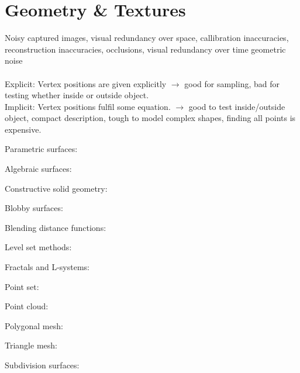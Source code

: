 \section{Geometry \& Textures}
 Noisy captured images, visual redundancy over space, callibration inaccuracies, reconstruction inaccuracies, occlusions, visual redundancy over time geometric noise \\
 \\
Explicit: Vertex positions are given explicitly $\rightarrow$ good for sampling, bad for testing whether inside or outside object.\\
Implicit: Vertex positions fulfil some equation. $\rightarrow$ good to test inside/outside object, compact description, tough to model complex shapes, finding all points is expensive.\\
\begin{compactitem}
    \item Parametric surfaces: 
    \item Algebraic surfaces: 
    \item Constructive solid geometry: 
    \item Blobby surfaces: 
    \item Blending distance functions: 
    \item Level set methods: 
    \item Fractals and L-systems: 
\end{compactitem}
\begin{compactitem}
    \item Point set: 
    \item Point cloud: 
    \item Polygonal mesh: 
    \item Triangle mesh: 
    \item Subdivision surfaces: 
 \end{compactitem}

